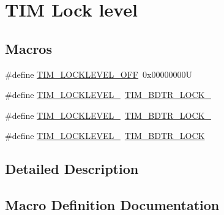 \hypertarget{group___t_i_m___lock__level}{}\section{T\+IM Lock level}
\label{group___t_i_m___lock__level}
\subsection*{Macros}
\begin{DoxyCompactItemize}
\item 
\#define \mbox{\hyperlink{group___t_i_m___lock__level_ga304aece56a9391a4d9b1016144d98fbd}{T\+I\+M\+\_\+\+L\+O\+C\+K\+L\+E\+V\+E\+L\+\_\+\+O\+FF}}~0x00000000U
\item 
\#define \mbox{\hyperlink{group___t_i_m___lock__level_ga46dc7705788ba2ce5135c43b998ef4dd}{T\+I\+M\+\_\+\+L\+O\+C\+K\+L\+E\+V\+E\+L\+\_}}~\mbox{\hyperlink{group___peripheral___registers___bits___definition_gabbd1736c8172e7cd098bb591264b07bf}{T\+I\+M\+\_\+\+B\+D\+T\+R\+\_\+\+L\+O\+C\+K\+\_}}
\item 
\#define \mbox{\hyperlink{group___t_i_m___lock__level_ga03a5ed2aded43ccfe7ab12a9dd53d251}{T\+I\+M\+\_\+\+L\+O\+C\+K\+L\+E\+V\+E\+L\+\_}}~\mbox{\hyperlink{group___peripheral___registers___bits___definition_ga756df80ff8c34399435f52dca18e6eee}{T\+I\+M\+\_\+\+B\+D\+T\+R\+\_\+\+L\+O\+C\+K\+\_}}
\item 
\#define \mbox{\hyperlink{group___t_i_m___lock__level_gaa1afed375c27151608e388fdf4a57a13}{T\+I\+M\+\_\+\+L\+O\+C\+K\+L\+E\+V\+E\+L\+\_}}~\mbox{\hyperlink{group___peripheral___registers___bits___definition_ga7e4215d17f0548dfcf0b15fe4d0f4651}{T\+I\+M\+\_\+\+B\+D\+T\+R\+\_\+\+L\+O\+CK}}
\end{DoxyCompactItemize}


\subsection{Detailed Description}


\subsection{Macro Definition Documentation}
\mbox{\label{group___t_i_m___lock__level_ga46dc7705788ba2ce5135c43b998ef4dd}} 
